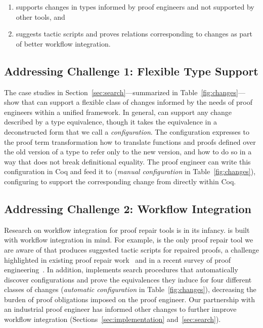 \begin{enumerate}
\item supports changes in types informed by proof engineers and not supported by other tools, and
\item suggests tactic scripts and proves relations corresponding to changes as part of better workflow integration.
\end{enumerate}

\subsection*{Addressing Challenge 1: Flexible Type Support}

The case studies in Section~\ref{sec:search}---summarized in Table~\ref{fig:changes}---show that \toolname can support a flexible class of changes informed by the needs of proof engineers within a unified framework.
In general, \toolname can support any change described by a type equivalence, though it takes the equivalence in a
deconstructed form that we call a \textit{configuration}.
The configuration expresses to the proof term transformation how to translate functions and proofs defined over the old version of a type
to refer only to the new version, and how to do so in a way that does not break definitional equality.
The proof engineer can write this configuration in Coq and feed it to \toolname (\textit{manual configuration} in Table~\ref{fig:changes}),
configuring \toolname to support the corresponding change from directly within Coq.

\subsection*{Addressing Challenge 2: Workflow Integration}

Research on workflow integration for proof repair tools is in its infancy.
\toolname is built with workflow integration in mind.
For example, \toolname is the only proof repair tool we are aware of that produces suggested tactic scripts for repaired proofs,
a challenge highlighted in existing proof repair work~\cite{pumpkinpatch, robert2018} and in 
a recent survey of proof engineering~\cite{PGL-045}.
In addition, \toolname implements search procedures that 
automatically discover configurations and prove the equivalences they induce for four different classes of 
changes (\textit{automatic configuration} in Table~\ref{fig:changes}),
decreasing the burden of proof obligations imposed on the proof engineer.
Our partnership with an industrial proof engineer has informed other changes to further improve workflow integration
(Sections~\ref{sec:implementation} and~\ref{sec:search}).

